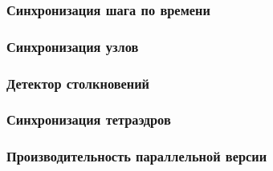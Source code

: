 \subsubsection{Синхронизация шага по времени}
\subsubsection{Синхронизация узлов}
\subsubsection{Детектор столкновений}
\subsubsection{Синхронизация тетраэдров}
\subsubsection{Производительность параллельной версии}

